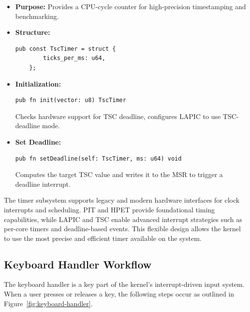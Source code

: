 \documentclass[12pt]{extarticle}
\begin{document}
\begin{itemize}
    \item \textbf{Purpose:} Provides a CPU-cycle counter for high-precision timestamping and benchmarking.

    \item \textbf{Structure:}
    \begin{lstlisting}[language=zig]
    pub const TscTimer = struct {
        ticks_per_ms: u64,
    };
    \end{lstlisting}

    \item \textbf{Initialization:}
    \begin{lstlisting}[language=zig]
    pub fn init(vector: u8) TscTimer
    \end{lstlisting}
    Checks hardware support for TSC deadline, configures LAPIC to use TSC-deadline mode.

    \item \textbf{Set Deadline:}
    \begin{lstlisting}[language=zig]
    pub fn setDeadline(self: TscTimer, ms: u64) void
    \end{lstlisting}
    Computes the target TSC value and writes it to the MSR to trigger a deadline interrupt.
\end{itemize}


The timer subsystem  supports legacy and modern hardware interfaces for clock interrupts and scheduling. PIT and HPET provide foundational timing capabilities, while LAPIC and TSC enable advanced interrupt strategies such as per-core timers and deadline-based events. This flexible design allows the kernel to use the most precise and efficient timer available on the system.

\pagebreak

\subsection{Keyboard Handler Workflow}
The keyboard handler is a key part of the kernel's interrupt-driven input system. When a user presses or releases a key, the following steps occur as outlined in Figure~\ref{fig:keyboard-handler}.
\end{document}
